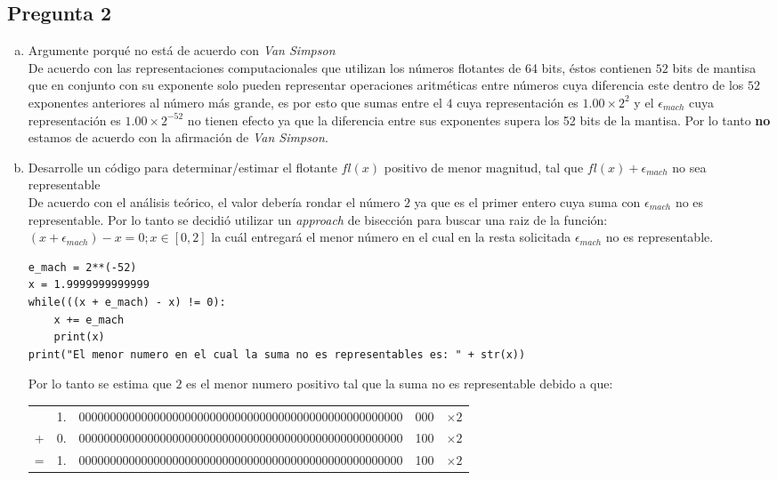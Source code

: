\documentclass[10pt]{article}
\begin{document}
\subsection{Pregunta 2}
\begin{enumerate}[a)]
\item Argumente porqué no está de acuerdo con \textit{Van Simpson} \\
De acuerdo con las representaciones computacionales que utilizan los números flotantes de 64 bits, éstos contienen $52$ bits de mantisa que en conjunto con su exponente solo pueden representar operaciones aritméticas entre números cuya diferencia este dentro de los $52$ exponentes anteriores al número más grande, es por esto que sumas entre el $4$ cuya representación es $1.00 \times 2^{2}$ y el $\epsilon_{mach}$ cuya representación es $1.00 \times 2^{-52}$ no tienen efecto ya que la diferencia entre sus exponentes supera los 52 bits de la mantisa. Por lo tanto \textbf{no} estamos de acuerdo con la afirmación de \textit{Van Simpson}.

\item Desarrolle un código para determinar/estimar el flotante $fl(x)$ positivo de menor magnitud, tal que $fl(x) + \epsilon_{mach}$ no sea representable\\
De acuerdo con el análisis teórico, el valor debería rondar el número $2$ ya que es el primer entero cuya suma con $\epsilon_{mach}$ no es representable. Por lo tanto se decidió utilizar un \textit{approach} de bisección para buscar una raiz de la función: $(x + \epsilon_{mach}) - x = 0 ; x \in [0, 2]$ la cuál entregará el menor número en el cual en la resta solicitada $\epsilon_{mach}$ no es representable.
\begin{verbatim}
e_mach = 2**(-52)
x = 1.9999999999999
while(((x + e_mach) - x) != 0):
	x += e_mach
	print(x)
print("El menor numero en el cual la suma no es representables es: " + str(x))
\end{verbatim}
Por lo tanto se estima que $2$ es el menor numero positivo tal que la suma no es representable debido a que:
\begin{center}
\begin{tabular}{c c | c | c | c}
 \cline{3-4}
 & 1. & 0000000000000000000000000000000000000000000000000000 & 000 & $\times 2$\\
 \cline{3-4}
 + & 0. & 0000000000000000000000000000000000000000000000000000 & 100 & $\times 2$\\
 \cline{1-5}
 = & 1. & 0000000000000000000000000000000000000000000000000000 & 100 & $\times 2$\\
 \cline{3-4}
\end{tabular}
\end{center}


\end{enumerate}
\end{document}
